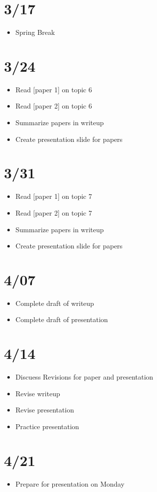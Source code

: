 \documentclass[12pt]{article}
\begin{document}
\section*{3/17}
\vspace{-0.5cm}
\begin{itemize}
    \item Spring Break
\end{itemize}

\section*{3/24}
\vspace{-0.5cm}
\begin{itemize}
    \item Read [paper 1] on topic 6
    \item Read [paper 2] on topic 6
    \item Summarize papers in writeup
    \item Create presentation slide for papers
\end{itemize}

\section*{3/31}
\vspace{-0.5cm}
\begin{itemize}
   \item Read [paper 1] on topic 7
   \item Read [paper 2] on topic 7
   \item Summarize papers in writeup
   \item Create presentation slide for papers
\end{itemize}

\section*{4/07}
\vspace{-0.5cm}
\begin{itemize}
    \item Complete draft of writeup
    \item Complete draft of presentation
\end{itemize}

\section*{4/14}
\vspace{-0.5cm}
\begin{itemize}
    \item Discuess Revisions for paper and presentation
    \item  Revise writeup
    \item Revise presentation
    \item Practice presentation
\end{itemize}

\section*{4/21}
\vspace{-0.5cm}
\begin{itemize}
    \item Prepare for presentation on Monday
\end{itemize}
\end{document}
